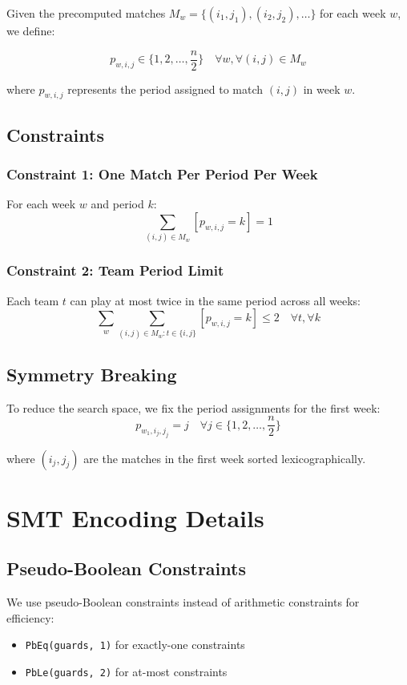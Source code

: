 \documentclass{article}
\begin{document}
Given the precomputed matches $M_w = \{(i_1, j_1), (i_2, j_2), \ldots\}$ for each week $w$, we define:

\begin{equation}
p_{w,i,j} \in \{1, 2, \ldots, \frac{n}{2}\} \quad \forall w, \forall (i,j) \in M_w
\end{equation}

where $p_{w,i,j}$ represents the period assigned to match $(i,j)$ in week $w$.

\subsection{Constraints}

\subsubsection{Constraint 1: One Match Per Period Per Week}
For each week $w$ and period $k$:
\begin{equation}
\sum_{(i,j) \in M_w} [p_{w,i,j} = k] = 1
\end{equation}

\subsubsection{Constraint 2: Team Period Limit}
Each team $t$ can play at most twice in the same period across all weeks:
\begin{equation}
\sum_{w} \sum_{(i,j) \in M_w : t \in \{i,j\}} [p_{w,i,j} = k] \leq 2 \quad \forall t, \forall k
\end{equation}

\subsection{Symmetry Breaking}

To reduce the search space, we fix the period assignments for the first week:
\begin{equation}
p_{w_1, i_j, j_j} = j \quad \forall j \in \{1, 2, \ldots, \frac{n}{2}\}
\end{equation}

where $(i_j, j_j)$ are the matches in the first week sorted lexicographically.

\section{SMT Encoding Details}

\subsection{Pseudo-Boolean Constraints}
We use pseudo-Boolean constraints instead of arithmetic constraints for efficiency:
\begin{itemize}
    \item \texttt{PbEq(guards, 1)} for exactly-one constraints
    \item \texttt{PbLe(guards, 2)} for at-most constraints
\end{itemize}
\end{document}
